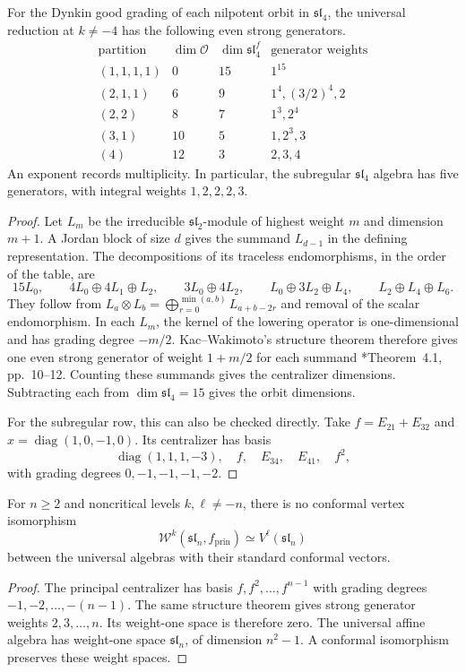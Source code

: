 \begin{proposition}\label{prop:cbc28-sl4-centralizers}
For the Dynkin good grading of each nilpotent orbit in $\mathfrak{sl}_4$, the universal reduction at $k\ne-4$ has the following even strong generators.
\[
 \begin{array}{c|c|c|c}
 \text{partition}&\dim\mathcal O&\dim\mathfrak{sl}_4^f&\text{generator weights}\\\hline
 (1,1,1,1)&0&15&1^{15}\\
 (2,1,1)&6&9&1^4,(3/2)^4,2\\
 (2,2)&8&7&1^3,2^4\\
 (3,1)&10&5&1,2^3,3\\
 (4)&12&3&2,3,4
 \end{array}
\]
An exponent records multiplicity.
In particular, the subregular $\mathfrak{sl}_4$ algebra has five generators, with integral weights $1,2,2,2,3$.
\end{proposition}
\begin{proof}
Let $L_m$ be the irreducible $\mathfrak{sl}_2$-module of highest weight $m$ and dimension $m+1$.
A Jordan block of size $d$ gives the summand $L_{d-1}$ in the defining representation.
The decompositions of its traceless endomorphisms, in the order of the table, are
\[
 15L_0,\qquad 4L_0\oplus4L_1\oplus L_2,\qquad
 3L_0\oplus4L_2,\qquad L_0\oplus3L_2\oplus L_4,
 \qquad L_2\oplus L_4\oplus L_6.
\]
They follow from
$L_a\otimes L_b=\bigoplus_{r=0}^{\min(a,b)}L_{a+b-2r}$ and removal of the scalar endomorphism.
In each $L_m$, the kernel of the lowering operator is one-dimensional and has grading degree $-m/2$.
Kac--Wakimoto's structure theorem therefore gives one even strong generator of weight $1+m/2$ for each summand
\cite{SubregularKW027}*{Theorem~4.1, pp.~10--12}.
Counting these summands gives the centralizer dimensions.
Subtracting each from $\dim\mathfrak{sl}_4=15$ gives the orbit dimensions.

For the subregular row, this can also be checked directly.
Take $f=E_{21}+E_{32}$ and $x=\operatorname{diag}(1,0,-1,0)$.
Its centralizer has basis
\[
 \operatorname{diag}(1,1,1,-3),\quad f,\quad E_{34},\quad E_{41},\quad f^2,
\]
with grading degrees $0,-1,-1,-1,-2$.
\end{proof}

\begin{corollary}\label{cor:cbc28-principal-affine}
For $n\geq2$ and noncritical levels $k,\ell\ne-n$, there is no conformal vertex isomorphism
\[
 \mathcal W^k(\mathfrak{sl}_n,f_{\mathrm{prin}})
 \simeq V^\ell(\mathfrak{sl}_n)
\]
between the universal algebras with their standard conformal vectors.
\end{corollary}
\begin{proof}
The principal centralizer has basis $f,f^2,\ldots,f^{n-1}$ with grading degrees $-1,-2,\ldots,-(n-1)$.
The same structure theorem gives strong generator weights $2,3,\ldots,n$.
Its weight-one space is therefore zero.
The universal affine algebra has weight-one space $\mathfrak{sl}_n$, of dimension $n^2-1$.
A conformal isomorphism preserves these weight spaces.
\end{proof}

